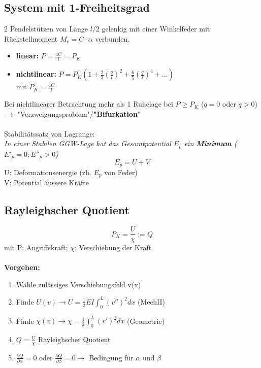     \subsection{System mit 1-Freiheitsgrad}
        2 Pendelstützen von Länge $l/2$ gelenkig mit einer Winkelfeder mit Rückstellmoment $M_c=C\cdot\alpha$ verbunden.
        \begin{itemize}
            \item \textbf{linear:} $P=\frac{4C}{l}=P_K$
            \item \textbf{nichtlinear:} $P=P_K\left(1+\frac{2}{3}\left(\frac{q}{l}\right)^2+\frac{6}{5}\left(\frac{q}{l}\right)^4+\dots\right)$ \\mit $P_K=\frac{4C}{l}$
        \end{itemize}
        Bei nichtlinearer Betrachtung mehr als 1 Ruhelage bei $P\geqslant P_K$ ($q=0$ oder $q >0$) $\rightarrow$ "Verzweigungsproblem"/\textbf{"Bifurkation"}\\\\
        Stabilitätssatz von Lagrange:\\
        \textit{In einer Stabilen GGW-Lage hat das Gesamtpotential $E_p$ ein \textbf{Minimum} ($E'_p=0; E''_p>0$)}
        \vspace{-2mm}\[E_p = U+V\]
        U: Deformationsenergie (zb. $E_p$ von Feder) 
        \\V: Potential äussere Kräfte
    \subsection{Rayleighscher Quotient}
        \[P_K=\frac{U}{\chi}:=Q\]
        mit P: Angriffskraft; \quad $\chi$: Verschiebung der Kraft\\\\
        \textbf{Vorgehen:}
        \begin{enumerate}
            \item Wähle zulässiges Verschiebungsfeld v(x)
            \item Finde $\displaystyle U(v) \rightarrow U = \frac{1}{2}EI\int_{0}^{L}(v'')^2dx$ \quad(MechII)
            \item Finde $\displaystyle \chi(v) \rightarrow \chi=\frac{1}{2}\int_{0}^{L}(v')^2dx$ \qquad(Geometrie)
            \item $Q=\frac{U}{\chi}$ Rayleighscher Quotient
            \item $\displaystyle\frac{\partial Q}{\partial\alpha}=0 \textrm{ oder } \frac{\partial Q}{\partial\beta}=0 \rightarrow$ Bedingung für $\alpha \textrm{ und } \beta$
            
            
        \end{enumerate}
        